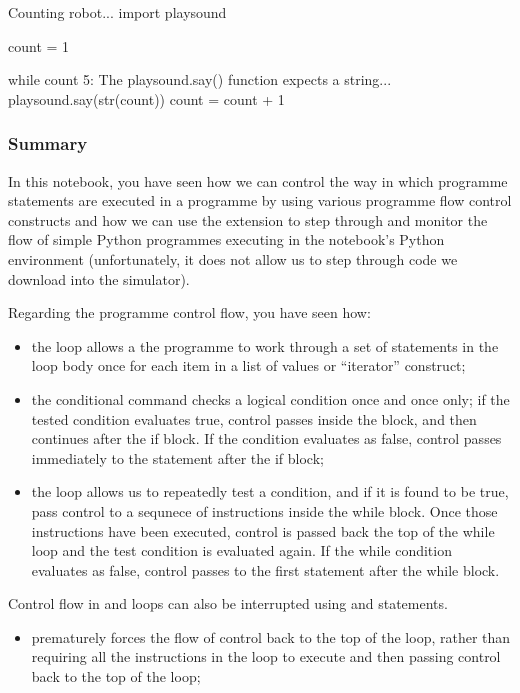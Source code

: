 \documentclass[letterpaper,10pt,english]{sphinxmanual}
\begin{document}
{{\begin{sphinxVerbatim}[commandchars=\\\{\}]
\PYGZsh{}Counting robot...
import playsound

count = 1

while count \PYGZlt{} 5:
    \PYGZsh{} The playsound.say() function expects a string...
    playsound.say(str(count))
    count = count + 1
\end{sphinxVerbatim}
}


\subsubsection{Summary}
\label{\detokenize{content/02_Robot_Lab/Section_00_01:Summary}}
In this notebook, you have seen how we can control the way in which programme statements are executed in a programme by using various programme flow control constructs and how we can use the  extension to step through and monitor the flow of simple Python programmes executing in the notebook’s Python environment (unfortunately, it does not allow us to step through code we download into the simulator).

Regarding the programme control flow, you have seen how:
\begin{itemize}
\item {} 
the  loop allows a the programme to work through a set of statements in the loop body once for each item in a list of values or “iterator” construct;

\item {} 
the  conditional command checks a logical condition once and once only; if the tested condition evaluates true, control passes inside the block, and then continues after the if block. If the condition evaluates as false, control passes immediately to the statement after the if block;

\item {} 
the  loop allows us to repeatedly test a condition, and if it is found to be true, pass control to a sequnece of instructions inside the while block. Once those instructions have been executed, control is passed back the top of the while loop and the test condition is evaluated again. If the while condition evaluates as false, control passes to the first statement after the while block.

\end{itemize}

Control flow in  and  loops can also be interrupted using  and  statements.
\begin{itemize}
\item {} 
 prematurely forces the flow of control back to the top of the loop, rather than requiring all the instructions in the loop to execute and then passing control back to the top of the loop;


\end{itemize}}
\end{document}
